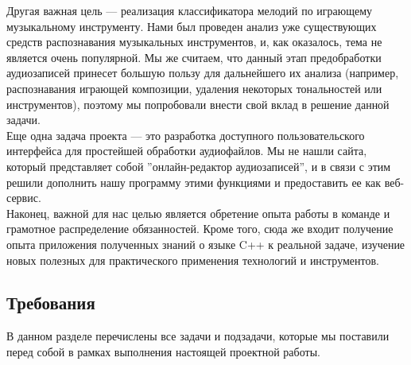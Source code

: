 \documentclass[14pt,a4paper]{article}
\begin{document}
Другая важная цель --- реализация классификатора мелодий по играющему музыкальному инструменту. Нами был проведен анализ уже существующих средств распознавания музыкальных инструментов, и, как оказалось, тема не является очень популярной. Мы же считаем, что данный этап предобработки аудиозаписей принесет большую пользу для дальнейшего их анализа (например, распознавания играющей композиции, удаления некоторых тональностей или инструментов), поэтому мы попробовали внести свой вклад в решение данной задачи. \\

Еще одна задача проекта --- это разработка доступного пользовательского интерфейса для простейшей обработки аудиофайлов. Мы не нашли сайта, который представляет собой ''онлайн-редактор аудиозаписей'', и в связи с этим решили дополнить нашу программу этими функциями и предоставить ее как веб-сервис. \\

Наконец, важной для нас целью является обретение опыта работы в команде и грамотное распределение обязанностей. Кроме того, сюда же входит получение опыта приложения полученных знаний о языке C++ к реальной задаче, изучение новых полезных для практического применения технологий и инструментов.

\subsection{Требования}

В данном разделе перечислены все задачи и подзадачи, которые мы поставили перед собой в рамках выполнения настоящей проектной работы.
\end{document}
